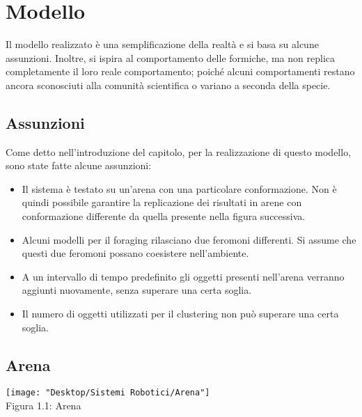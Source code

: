 \documentclass[12pt,a4paper,openright,twoside]{report}
\begin{document}
	\chapter{Modello}                %
	\lhead[\fancyplain{}{\bfseries\thepage}]{\fancyplain{}{\bfseries\rightmark}}

Il modello realizzato è una semplificazione della realtà e si basa su alcune assunzioni. Inoltre, si ispira al comportamento delle formiche, ma non replica completamente il loro reale comportamento; poiché alcuni comportamenti restano ancora sconosciuti alla comunità scientifica o variano a seconda della specie.

\section{Assunzioni}

Come detto nell'introduzione del capitolo, per la realizzazione di questo modello, sono state fatte alcune assunzioni:

\begin{itemize}
	\item Il sistema è testato su un'arena con una particolare conformazione. Non è quindi possibile garantire la replicazione dei risultati in arene con conformazione differente da quella presente nella figura successiva.
	\item Alcuni modelli per il foraging rilasciano due feromoni differenti. Si assume che questi due feromoni possano coesistere nell'ambiente.
	\item A un intervallo di tempo predefinito gli oggetti presenti nell'arena verranno aggiunti nuovamente, senza  superare una certa soglia.
	\item Il numero di oggetti utilizzati per il clustering non può superare una certa soglia.
\end{itemize}

\section{Arena}

\begin{center}  
	\texttt{[image: "Desktop/Sistemi Robotici/Arena"]}
	\\Figura 1.1: Arena
\end{center}
\end{document}
